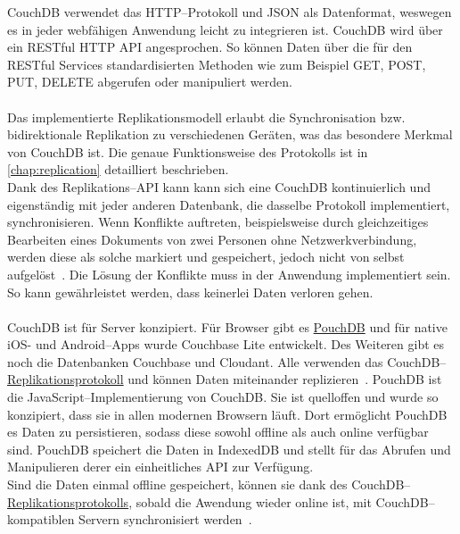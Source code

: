 CouchDB verwendet das \gls{HTTP}--Protokoll und \gls{JSON} als Datenformat, weswegen es in jeder webfähigen Anwendung leicht zu integrieren ist.
CouchDB wird über ein \gls{REST}ful \gls{HTTP} \gls{API} angesprochen. So können Daten über die für den \gls{REST}ful Services standardisierten Methoden wie zum Beispiel GET, POST, PUT, DELETE abgerufen oder manipuliert werden.\\\\
%
%
Das implementierte Replikationsmodell erlaubt die Synchronisation bzw. bidirektionale Replikation zu verschiedenen Geräten, was das besondere Merkmal von CouchDB ist.
Die genaue Funktionsweise des Protokolls ist in \autoref{chap:replication} detailliert beschrieben.\\
% 
Dank des Replikations--\gls{API} kann kann sich eine CouchDB kontinuierlich und eigenständig mit jeder anderen Datenbank, die dasselbe Protokoll implementiert, synchronisieren.
Wenn Konflikte auftreten, beispielsweise durch gleichzeitiges Bearbeiten eines Dokuments von zwei Personen ohne Netzwerkverbindung, werden diese als solche markiert und gespeichert, jedoch nicht von selbst aufgelöst~\cite{couch}.
Die Lösung der Konflikte muss in der Anwendung implementiert sein.
So kann gewährleistet werden, dass keinerlei Daten verloren gehen.\\\\
%
%
CouchDB ist für Server konzipiert. Für Browser gibt es \hyperref[chap:pouch]{PouchDB} und für native iOS- und Android--\glspl{App} wurde Couchbase Lite entwickelt.
Des Weiteren gibt es noch die Datenbanken Couchbase und Cloudant.
Alle verwenden das CouchDB--\hyperref[chap:replication]{Replikationsprotokoll} und können Daten miteinander replizieren~\cite{couch}.
%
%
PouchDB ist die JavaScript--Implementierung von CouchDB.
Sie ist quelloffen und wurde so konzipiert, dass sie in allen modernen Browsern läuft. Dort ermöglicht PouchDB es Daten zu persistieren, sodass diese sowohl offline als auch online verfügbar sind.
PouchDB speichert die Daten in IndexedDB und stellt für das Abrufen und Manipulieren derer ein einheitliches \gls{API} zur Verfügung.\\
Sind die Daten einmal offline gespeichert, können sie dank des CouchDB--\hyperref[chap:replication]{Replikationsprotokolls}, sobald die Awendung wieder online ist, mit CouchDB--kompatiblen Servern synchronisiert werden~\cite{pouch}.